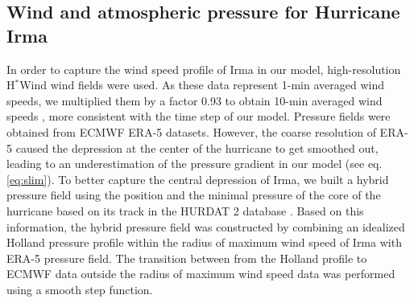 \documentclass[11pt,a4paper]{article}
\begin{document}
\subsection{Wind and atmospheric pressure for Hurricane Irma}
In order to capture the wind speed profile of Irma in our model, high-resolution H$^\ast$Wind \citep{powell1998hrd} wind fields were used. As these data represent 1-min averaged wind speeds, we multiplied them by a factor 0.93 to obtain 10-min averaged wind speeds \citep{harper2010guidelines}, more consistent with the time step of our model. Pressure fields were obtained from ECMWF ERA-5 datasets. However, the coarse resolution of ERA-5 caused the depression at the center of the hurricane to get smoothed out, leading to an underestimation of the pressure gradient in our model (see eq. \ref{eq:slim}). To better capture the central depression of Irma, we built a hybrid pressure field using the position and the minimal pressure of the core of the hurricane based on its track in the HURDAT 2 database \citep{landsea2013atlantic}. Based on this information, the hybrid pressure field was constructed by combining an idealized Holland pressure profile \citep{lin2012hurricane} within the radius of maximum wind speed of Irma \citep{knaff2018statistical} with ERA-5 pressure field. The transition between from the Holland profile to ECMWF data outside the radius of maximum wind speed data was performed using a smooth step function.
\end{document}
